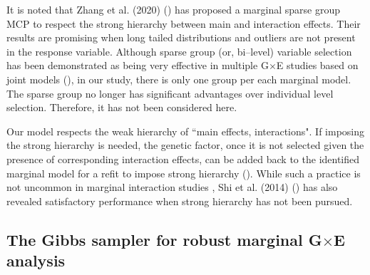 \documentclass[12pt]{article}
\begin{document}
It is noted that Zhang et al. (2020)  (\cite{ZSX}) has proposed a marginal sparse group MCP to respect the strong hierarchy between main and interaction effects. Their results are promising when long tailed distributions and outliers are not present in the response variable. Although sparse group (or, bi--level) variable selection has been demonstrated as being very effective in multiple G$\times$E studies based on joint models (\cite{ZFR}), in our study, there is only one group per each marginal model. The sparse group no longer has significant advantages over individual level selection. Therefore, it has not been considered here.

Our model respects the weak hierarchy of  ``main effects, interactions". If imposing the strong hierarchy is needed, the genetic factor, once it is not selected given the presence of corresponding interaction effects, can be added back to the identified marginal model for a refit to impose strong hierarchy (\cite{CZJ}). While such a practice is not uncommon in marginal interaction studies , Shi et al. (2014) (\cite{SLH}) has also revealed satisfactory performance when strong hierarchy has not been pursued. 



\subsection{ The Gibbs sampler for robust marginal G$\times $E analysis }
\end{document}
